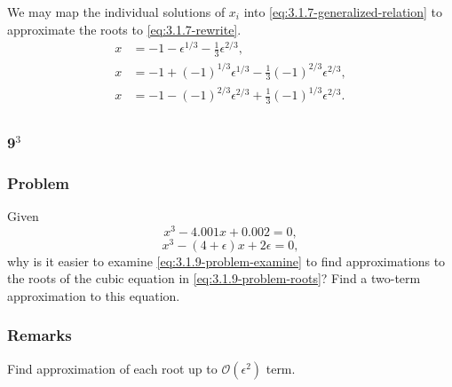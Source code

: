 \documentclass[12pt,twoside]{article}
\begin{document}
We may map the individual solutions of $x_i$ into
\cref{eq:3.1.7-generalized-relation} to approximate the roots to
\cref{eq:3.1.7-rewrite}.
\begin{equation*}
  \boxed{
    \begin{aligned}
      x &= -1 - \epsilon^{1/3} - \frac{1}{3}\epsilon^{2/3}, \\
      x &= -1 + {(-1)}^{1/3}\epsilon^{1/3} - \frac{1}{3}{(-1)}^{2/3}\epsilon^{2/3}, \\
      x &= -1 - {(-1)}^{2/3}\epsilon^{2/3} + \frac{1}{3}{(-1)}^{1/3}\epsilon^{2/3}. \\
    \end{aligned}
  }
\end{equation*}

\subsubsection{9$^3$}
\subsubsection*{Problem}
Given
\begin{equation}
  \label{eq:3.1.9-problem-roots}
  x^3-4.001x+0.002=0,
\end{equation}
\begin{equation}
  \label{eq:3.1.9-problem-examine}
  x^3-(4+\epsilon)x+2\epsilon=0,
\end{equation}
why is it easier to examine \cref{eq:3.1.9-problem-examine} to find
approximations to the roots of the cubic equation in
\cref{eq:3.1.9-problem-roots}? Find a two-term approximation to this equation.
\subsubsection*{Remarks}
Find approximation of each root up to $\mathcal{O}(\epsilon^2)$ term.
\end{document}
